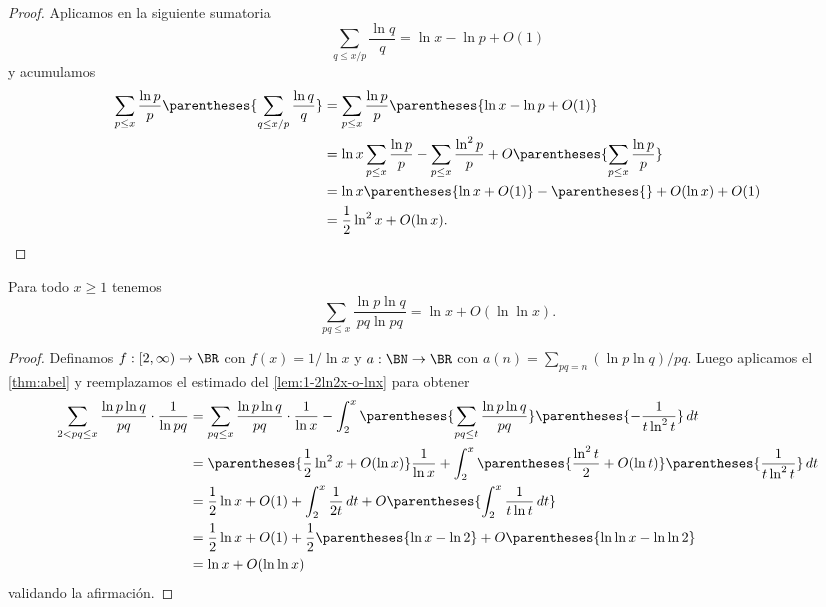 \begin{proof}
    Aplicamos \cite[teorema 2]{Mertens1874} en la siguiente sumatoria
    \[
        \sum_{q \leq x/p} \frac{\ln q}{q} = \ln x - \ln p + O(1)
    \]
    y acumulamos
    \begin{align*}
        \sum_{p \leq x} \frac{\ln p}{p}
        \parentheses{\sum_{q \leq x / p} \frac{\ln q}{q}}
        &= \sum_{p \leq x} \frac{\ln p}{p} \parentheses{\ln x - \ln p + O(1)} \\
        &= \ln x \sum_{p \leq x} \frac{\ln p}{p} - \sum_{p \leq x} \frac{\ln^2 p}{p} + O\parentheses{\sum_{p \leq x}\frac{\ln p}{p}} \\
        &= \ln x \parentheses{\ln x + O(1)} - \parentheses{} + O(\ln x) + O(1) \\
        &= \frac{1}{2} \ln^2 x + O(\ln x).
    \end{align*}
\end{proof}

\begin{lemma}
    \label{lem:lnp-lnq-pq-lnpq}
    Para todo \(x \geq 1\) tenemos
    \[
        \sum_{pq \leq x} \frac{\ln p \ln q}{pq \ln pq}
        = \ln x + O(\ln \ln x).   
    \]
\end{lemma}

\begin{proof}
    Definamos \(f: [2, \infty) \to \BR\) con \(f(x) = 1/\ln x\) y
    \(a: \BN \to \BR\) con \(a(n) = \sum_{pq = n} (\ln p \ln q) / pq\).
    Luego aplicamos el \cref{thm:abel}
    y reemplazamos el estimado del \cref{lem:1-2ln2x-o-lnx} para obtener
    \begin{align*}
        \sum_{2 < pq \leq x} \frac{\ln p \ln q}{pq} \cdot \frac{1}{\ln pq}
        &= \sum_{pq \leq x} \frac{\ln p \ln q}{pq} \cdot \frac{1}{\ln x}
        - \int_2^x \parentheses{\sum_{pq \leq t} \frac{\ln p \ln q}{pq}}
        \parentheses{-\frac{1}{t \ln^2 t}} \, dt \\
        &= \parentheses{\frac{1}{2} \ln^2x + O(\ln x)} \frac{1}{\ln x}
        + \int_2^x \parentheses{\frac{\ln^2 t}{2} + O(\ln t)}\parentheses{\frac{1}{t \ln^2 t}} \, dt \\
        &= \frac{1}{2}\ln x + O(1) + \int_{2}^x \frac{1}{2t} \, dt + O\parentheses{\int_2^x \frac{1}{t \ln t} \, dt} \\
        &= \frac{1}{2}\ln x + O(1) + \frac{1}{2}\parentheses{\ln x - \ln 2} + O\parentheses{\ln \ln x - \ln \ln 2} \\
        &= \ln x + O(\ln \ln x)
    \end{align*}
    validando la afirmaci\'on.
\end{proof}

